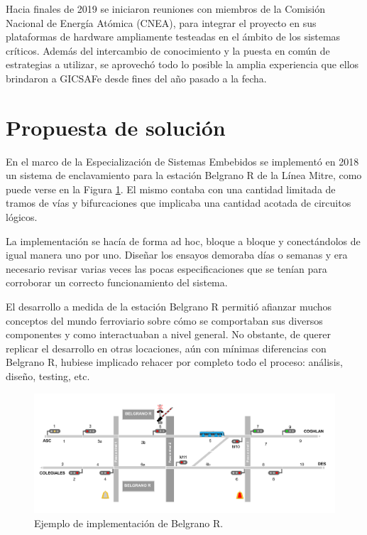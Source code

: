		Hacia finales de 2019 se iniciaron reuniones con miembros de la Comisión Nacional de Energía Atómica (CNEA), para integrar el proyecto en sus plataformas de hardware ampliamente testeadas en el ámbito de los sistemas críticos. Además del intercambio de conocimiento y la puesta en común de estrategias a utilizar, se aprovechó todo lo posible la amplia experiencia que ellos brindaron a GICSAFe desde fines del año pasado a la fecha.
		
	\section{Propuesta de solución}	
		
		En el marco de la Especialización de Sistemas Embebidos se implementó en 2018 un sistema de enclavamiento para la estación Belgrano R de la Línea Mitre, como puede verse en la Figura \ref{fig:CESE_1}. El mismo contaba con una cantidad limitada de tramos de vías y bifurcaciones que implicaba una cantidad acotada de circuitos lógicos.%
		
		La implementación se hacía de forma ad hoc, bloque a bloque y conectándolos de igual manera uno por uno. Diseñar los ensayos demoraba días o semanas y era necesario revisar varias veces las pocas especificaciones que se tenían para corroborar un correcto funcionamiento del sistema.	
		
		El desarrollo a medida de la estación Belgrano R permitió afianzar muchos conceptos del mundo ferroviario sobre cómo se comportaban sus diversos componentes y como interactuaban a nivel general. No obstante, de querer replicar el desarrollo en otras locaciones, aún con mínimas diferencias con Belgrano R, hubiese implicado rehacer por completo todo el proceso: análisis, diseño, testing, etc.
		
		\begin{figure}[htbp!]
			\centering
			\includegraphics[scale=.27]{./Figures/Belgrano_R}
			\caption{Ejemplo de implementación de Belgrano R.}
			\label{fig:CESE_1}
		\end{figure}	
		
